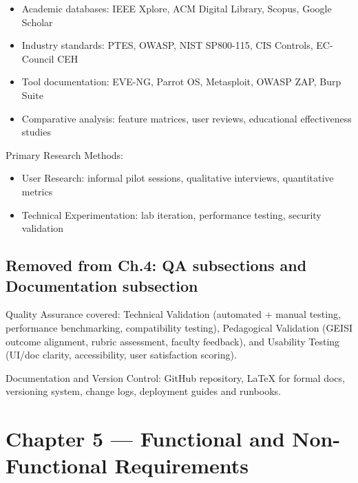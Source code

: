 \documentclass[a4paper,11pt]{article}
\begin{document}

\begin{itemize}
  \item Academic databases: IEEE Xplore, ACM Digital Library, Scopus, Google Scholar
  \item Industry standards: PTES, OWASP, NIST SP800-115, CIS Controls, EC-Council CEH
  \item Tool documentation: EVE-NG, Parrot OS, Metasploit, OWASP ZAP, Burp Suite
  \item Comparative analysis: feature matrices, user reviews, educational effectiveness studies
\end{itemize}

Primary Research Methods:
\begin{itemize}
  \item User Research: informal pilot sessions, qualitative interviews, quantitative metrics
  \item Technical Experimentation: lab iteration, performance testing, security validation
\end{itemize}

\subsection{Removed from Ch.4: QA subsections and Documentation subsection}


Quality Assurance covered: Technical Validation (automated + manual testing, performance
benchmarking, compatibility testing), Pedagogical Validation (GEISI outcome alignment,
rubric assessment, faculty feedback), and Usability Testing (UI/doc clarity, accessibility,
user satisfaction scoring).

Documentation and Version Control: GitHub repository, LaTeX for formal docs, versioning
system, change logs, deployment guides and runbooks.

\section{Chapter 5 --- Functional and Non-Functional Requirements}
\end{document}
